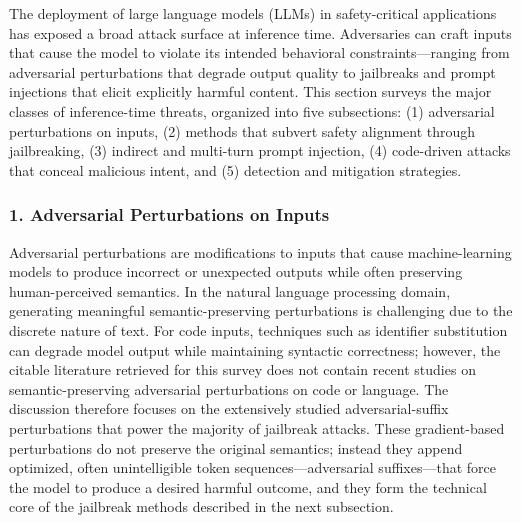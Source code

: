 \documentclass[11pt,a4paper]{article}
\begin{document}
The deployment of large language models (LLMs) in safety-critical applications has exposed a broad attack surface at inference time. Adversaries can craft inputs that cause the model to violate its intended behavioral constraints---ranging from adversarial perturbations that degrade output quality to jailbreaks and prompt injections that elicit explicitly harmful content. This section surveys the major classes of inference-time threats, organized into five subsections: (1) adversarial perturbations on inputs, (2) methods that subvert safety alignment through jailbreaking, (3) indirect and multi-turn prompt injection, (4) code-driven attacks that conceal malicious intent, and (5) detection and mitigation strategies.

\subsubsection{1. Adversarial Perturbations on Inputs}

Adversarial perturbations are modifications to inputs that cause machine-learning models to produce incorrect or unexpected outputs while often preserving human-perceived semantics. In the natural language processing domain, generating meaningful semantic-preserving perturbations is challenging due to the discrete nature of text. For code inputs, techniques such as identifier substitution can degrade model output while maintaining syntactic correctness; however, the citable literature retrieved for this survey does not contain recent studies on semantic-preserving adversarial perturbations on code or language. The discussion therefore focuses on the extensively studied adversarial-suffix perturbations that power the majority of jailbreak attacks. These gradient-based perturbations do not preserve the original semantics; instead they append optimized, often unintelligible token sequences---adversarial suffixes---that force the model to produce a desired harmful outcome, and they form the technical core of the jailbreak methods described in the next subsection.
\end{document}
